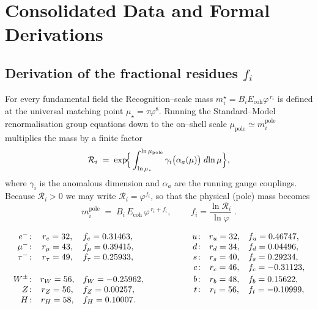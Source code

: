 \section{Consolidated Data and Formal Derivations}

\subsection{Derivation of the fractional residues \texorpdfstring{$f_i$}{f\_i}}
\label{subsec:fi-derivation}

For every fundamental field the Recognition--scale mass
\(m_i^{\star}=B_i E_{\mathrm{coh}}\varphi^{\,r_i}\) is defined at the
universal matching point \(\mu_\star=\tau\varphi^{8}\).
Running the Standard--Model renormalisation group equations down to the
on--shell scale \(\mu_{\text{pole}}\simeq m_i^{\text{pole}}\) multiplies the
mass by a finite factor
\begin{equation}
  \mathcal R_i
  \;=\;
  \exp\!\Bigl\{\,
      \int_{\ln\mu_\star}^{\ln\mu_{\text{pole}}}
         \gamma_i\bigl(\alpha_a(\mu)\bigr)\;d\!\ln\mu
        \Bigr\},
\end{equation}
where \(\gamma_i\) is the anomalous dimension and \(\alpha_a\) are the
running gauge couplings.
Because \(\mathcal R_i>0\) we may write \(\mathcal R_i=\varphi^{f_i}\),
so that the physical (pole) mass becomes
\begin{equation}
  m_i^{\text{pole}}
   \;=\;
   B_i\,E_{\mathrm{coh}}\,
   \varphi^{\,r_i+f_i},
   \qquad
   \boxed{\;
     f_i=\frac{\ln\mathcal R_i}{\ln\varphi}\;}.
\end{equation}

\renewcommand{\arraystretch}{1.15}
\[
\begin{array}{rcl@{\hspace{2cm}}rcl}
e^{-}\!: & r_{e}=32, & f_{e}=0.31463,&
u\!: & r_{u}=32, & f_{u}=0.46747,\\
\mu^{-}\!: & r_{\mu}=43, & f_{\mu}=0.39415,&
d\!: & r_{d}=34, & f_{d}=0.04496,\\
\tau^{-}\!: & r_{\tau}=49, & f_{\tau}=0.25933,&
s\!: & r_{s}=40, & f_{s}=0.29234,\\
&&&
c\!: & r_{c}=46, & f_{c}=-0.31123,\\[2pt]
W^{\pm}\!: & r_{W}=56, & f_{W}=-0.25962,&
b\!: & r_{b}=48, & f_{b}=0.15622,\\
Z\!: & r_{Z}=56, & f_{Z}=0.00257,&
t\!: & r_{t}=56, & f_{t}=-0.10999,\\
H\!: & r_{H}=58, & f_{H}=0.10007.\\
\end{array}
\]

